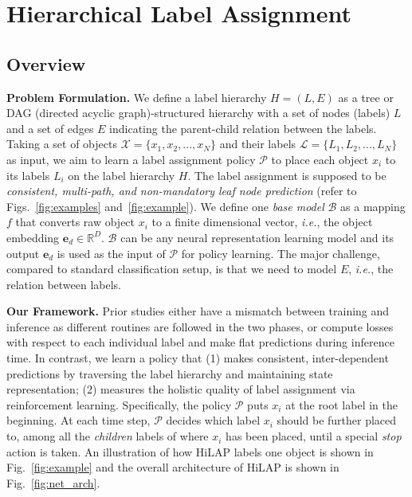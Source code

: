 \documentclass[11pt,a4paper]{article}
\newcommand{\ie}{\textit{i.e.}} \newcommand{\eg}{\textit{e.g.}}
\begin{document}
 
\section{Hierarchical Label Assignment}
\label{subsec_hla}

\subsection{Overview}

\noindent
\textbf{Problem Formulation.}
We define a label hierarchy $H = (L, E)$ as a tree or DAG (directed acyclic graph)-structured hierarchy with a set of nodes (labels) $L$ and a set of edges $E$ indicating the parent-child relation between the labels.
Taking a set of objects $\mathcal{X} = \{x_1, x_2, ..., x_N\}$ and their labels $\mathcal{L} = \{L_1, L_2, ..., L_N\}$ as input, we aim to learn a label assignment policy $\mathcal{P}$ to place each object $x_i$ to its labels $L_i$ on the label hierarchy $H$.
The label assignment is supposed to be \textit{consistent, multi-path, and non-mandatory leaf node prediction} (refer to Figs.~\ref{fig:examples} and~\ref{fig:example}).
We define one \textit{base model} $\mathcal{B}$ as a mapping $f$ that converts raw object $x_i$ to a finite dimensional vector, \ie, the object embedding $\textbf{e}_d \in \mathbb{R}^D$.
$\mathcal{B}$ can be any neural representation learning model and its output $\textbf{e}_d$ is used as the input of $\mathcal{P}$ for policy learning.
The major challenge, compared to standard classification setup, is that we need to model $E$, \ie, the relation between labels.


\smallskip
\noindent
\textbf{Our Framework.}
Prior studies either have a mismatch between training and inference as different routines are followed in the two phases, or compute losses with respect to each individual label and make flat predictions during inference time.
In contrast, we learn a policy that (1) makes consistent, inter-dependent predictions by traversing the label hierarchy and maintaining state representation; (2) measures the holistic quality of label assignment via reinforcement learning.
Specifically, the policy $\mathcal{P}$ puts $x_i$ at the root label in the beginning. At each time step, $\mathcal{P}$ decides which label $x_i$ should be further placed to, among all the \textit{children} labels of where $x_i$ has been placed, until a special \textit{stop} action is taken.
An illustration of how HiLAP labels one object is shown in Fig.~\ref{fig:example} and the overall architecture of HiLAP is shown in Fig.~\ref{fig:net_arch}.
\end{document}
